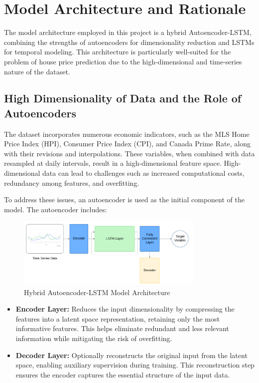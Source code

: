 \section{Model Architecture and Rationale}

The model architecture employed in this project is a hybrid Autoencoder-LSTM, combining the strengths of autoencoders for dimensionality reduction and LSTMs for temporal modeling. This architecture is particularly well-suited for the problem of house price prediction due to the high-dimensional and time-series nature of the dataset.

\subsection{High Dimensionality of Data and the Role of Autoencoders}

The dataset incorporates numerous economic indicators, such as the MLS Home Price Index (HPI), Consumer Price Index (CPI), and Canada Prime Rate, along with their revisions and interpolations. These variables, when combined with data resampled at daily intervals, result in a high-dimensional feature space. High-dimensional data can lead to challenges such as increased computational costs, redundancy among features, and overfitting.

To address these issues, an autoencoder is used as the initial component of the model. The autoencoder includes:

\begin{figure}[H]
    \centering
    \includegraphics[width=0.8\textwidth]{images/architecture.png}
    \caption{Hybrid Autoencoder-LSTM Model Architecture}
    \label{fig:architecture}
\end{figure}

\begin{itemize}
    \item \textbf{Encoder Layer:} Reduces the input dimensionality by compressing the features into a latent space representation, retaining only the most informative features. This helps eliminate redundant and less relevant information while mitigating the risk of overfitting.
    \item \textbf{Decoder Layer:} Optionally reconstructs the original input from the latent space, enabling auxiliary supervision during training. This reconstruction step ensures the encoder captures the essential structure of the input data.
\end{itemize}

